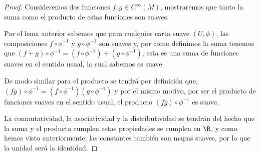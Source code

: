 \begin{proof}
  Consideremos dos funciones $f,g \in C^{\infty}(M)$, mostraremos que tanto la suma como el producto de estas funciones son suaves.

  Por el lema anterior sabemos que para cualquier carta suave $(U,\phi)$, las composiciones $f \circ \phi^{-1}$ y $g \circ \phi^{-1}$ son suaves y, por como definimos la suma tenemos que $(f + g)\circ \phi^{-1} = (f \circ \phi^{-1}) + (g \circ \phi^{-1})$, esta es una suma de funciones suaves en el sentido usual, la cual sabemos es suave.

  De modo similar para el producto se tendrá por definición que, $(fg)\circ\phi^{-1} = (f \circ \phi^{-1}) (g \circ \phi^{-1})$ y por el mismo motivo, por ser el producto de funciones suaves en el sentido usual, el producto $(fg) \circ \phi^{-1}$ es suave.

  La conmutatividad, la asociatividad y la distributividad se tendrán del hecho que la suma y el producto cumplen estas propiedades se cumplen en $\R$, y como hemos visto anteriormente, las constantes también son mapas suaves, por lo que la unidad será la identidad.
\end{proof}
